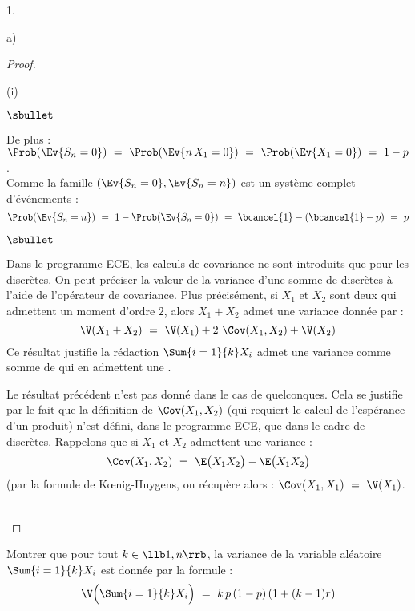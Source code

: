 \begin{noliste}{1.}
\begin{noliste}{a)}
\begin{proof}
\begin{nonoliste}{(i)}
\begin{noliste}{$\sbullet$}
	  \item De plus : $\Prob(\Ev{S_n=0}) \ = \ \Prob(\Ev{n \, X_1 
	  =0}) \ = \ \Prob(\Ev{X_1=0}) \ = \ 1-p$.\\
	  Comme la famille $(\Ev{S_n=0}, \Ev{S_n=n})$ est un système 
	  complet d'événements :
	  \[
	    \Prob(\Ev{S_n=n}) \ = \ 1-\Prob(\Ev{S_n=0}) \ = \
	    \bcancel{1}-(\bcancel{1}-p) \ = \ p
	  \]
        \end{noliste}
      \end{nonoliste}
      \begin{remarkL}{.98}%
        \begin{noliste}{$\sbullet$}
        \item Dans le programme ECE, les calculs de covariance ne sont
          introduits que pour les \var discrètes. On peut préciser la
          valeur de la variance d'une somme de \var discrètes à l'aide
          de l'opérateur de covariance. Plus précisément, si $X_1$ et
          $X_2$ sont deux \var {\bf discrètes} qui admettent un moment
          d'ordre $2$, alors $X_1 + X_2$ admet une variance donnée par
          :
          \[
          \V(X_1+ X_2) \ = \ \V(X_1) + 2 \ \Cov(X_1, X_2) + \V(X_2)
          \]
          Ce résultat justifie la rédaction \og $\Sum{i = 1}{k} X_i$
          admet une variance comme somme de \var {\bf discrètes} qui
          en admettent une \fg{}.
        \item Le résultat précédent n'est pas donné dans le cas de
          \var quelconques. Cela se justifie par le fait que la
          définition de $\Cov(X_1, X_2)$ (qui requiert le calcul de
          l'espérance d'un produit) n'est défini, dans le programme
          ECE, que dans le cadre de \var discrètes. Rappelons que si
          $X_1$ et $X_2$ admettent une variance :
          \[
          \Cov(X_1, X_2) \ = \ \E\big(X_1 X_2\big) - \E \big(X_1
          X_2\big)
          \]
          (par la formule de K\oe{}nig-Huygens, on récupère alors :
          $\Cov(X_1, X_1) \ = \ \V(X_1)$.
        \end{noliste}
      \end{remarkL}~\\[-1.4cm]
    \end{proof}


    \newpage

    
  \item Montrer que pour tout $k \in \llb 1,n \rrb$, la variance de la
    variable aléatoire $\Sum{i=1}{k} X_i$ est donnée par la formule :
    \[
    \V \Big(\Sum{i=1}{k} X_i\Big) \ = \ k \, p \, (1-p) \, (1+(k-1)r)
    \]
    

\end{noliste}
\end{noliste}
